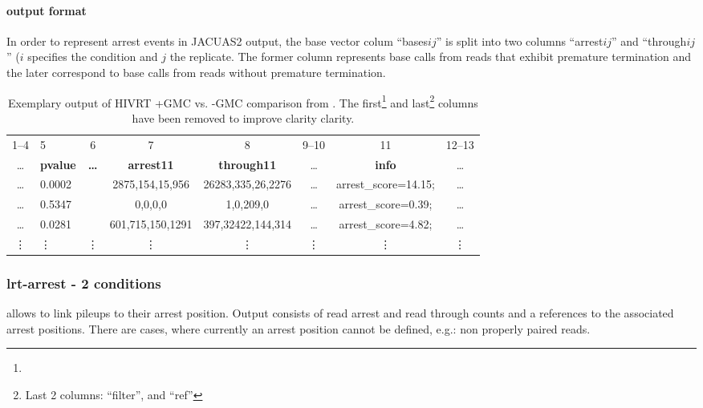 \documentclass[10pt,a4paper,final]{article}
\begin{document}
\paragraph{\rtarrest output format}\label{sec:rt_arrest}
In order to represent arrest events in JACUAS2 output, the base vector colum ``bases$ij$''  is split
into two columns ``arrest$ij$'' and ``through$ij$'' ($i$ specifies the condition and $j$ the replicate.
The former column represents base calls from reads that exhibit premature termination and the later
correspond to base calls from reads without premature termination.
\renewcommand{\lastColumns}{Last 2 columns: ``filter'', and ``ref''}
\begin{table}[ht]
  \centering
  \caption{Exemplary \rtarrest output of HIVRT +GMC vs. -GMC comparison from \cite{Zhou2018}. 
  The first\protect\footnote{\firstColumns} and last\protect\footnote{\lastColumns} columns have been 
  removed to improve clarity clarity.}
  \label{tbl:rt_arrest_output_format}
  \tiny{
  \begin{tabular}{clcccccc}
    1--4  & 5                & 6               & 7                 & 8                  & 9--10 & 11                   & 12--13 \\
    \ldots & \textbf{pvalue} & \textbf{\ldots} & \textbf{arrest11} & \textbf{through11} & \ldots & \textbf{info}       & \ldots \\
    \hline
    \ldots & 0.0002          &                 & 2875,154,15,956   & 26283,335,26,2276  & \ldots & arrest\_score=14.15;& \ldots \\
    \ldots & 0.5347          &                 & 0,0,0,0           & 1,0,209,0          & \ldots & arrest\_score=0.39; & \ldots \\
    \ldots & 0.0281          &                 & 601,715,150,1291  & 397,32422,144,314  & \ldots & arrest\_score=4.82; & \ldots \\
    \vdots & \vdots          & \vdots          & \vdots            & \vdots             & \vdots & \vdots              & \vdots \\
  \end{tabular}}
\end{table}
\subsubsection{lrt-arrest - 2 conditions}
\lrtarrest allows to link pileups to their arrest position. Output consists of read arrest and read through counts and 
a references to the associated arrest positions. There are cases, where currently an arrest position cannot be defined, 
e.g.: non properly paired reads.
\end{document}
